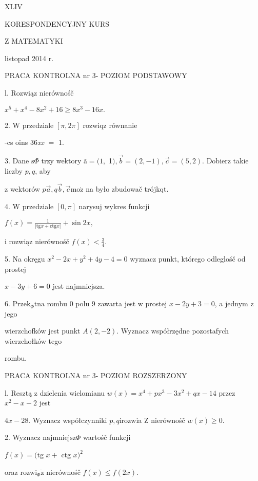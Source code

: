 \documentclass[a4paper,12pt]{article}
\begin{document}
XLIV

KORESPONDENCYJNY KURS

Z MATEMATYKI

listopad 2014 r.

PRACA KONTROLNA nr 3- POZIOM PODSTAWOWY

l. Rozwiąz nierównośč

$x^{5}+x^{4}-8x^{2}+16\geq 8x^{3}-16x.$

2. $\mathrm{W}$ przedziale $[\pi,2\pi]$ rozwiqz równanie

-cs  oins 36{\it xx} $=$ 1.

3. Dane $\mathrm{s}\Phi$ trzy wektory ã$= (1,$ 1$), \vec{b}= (2,-1), \vec{c}= (5,2)$. Dobierz takie liczby $p, q$, aby

$\mathrm{z}$ wektorów $p\vec{a}, q\vec{b}, \vec{c}\mathrm{m}\mathrm{o}\dot{\mathrm{z}}$ na było zbudowač trójkqt.

4. $\mathrm{W}$ przedziale $[0,\pi]$ narysuj wykres funkcji

$f(x)=\displaystyle \frac{1}{|\mathrm{t}\mathrm{g}x+\mathrm{c}\mathrm{t}\mathrm{g}x|}+\sin 2x,$

$\mathrm{i}$ rozwiąz nierównośč $f(x)<\displaystyle \frac{3}{4}.$

5. Na okręgu $x^{2}-2x+y^{2}+4y-4 = 0$ wyznacz punkt, którego odleglośč od prostej

$x-3y+6=0$ jest najmniejsza.

6. $\mathrm{P}\mathrm{r}\mathrm{z}\mathrm{e}\mathrm{k}_{\Phi}\mathrm{t}\mathrm{n}\mathrm{a}$ rombu $0$ polu 9 zawarta jest $\mathrm{w}$ prostej $x-2y+3 = 0$, a jednym $\mathrm{z}$ jego

wierzchofków jest punkt $A(2,-2)$. Wyznacz współrzędne pozostafych wierzchołków tego

rombu.




PRACA KONTROLNA nr 3- POZIOM ROZSZERZONY

l. Resztą $\mathrm{z}$ dzielenia wielomianu $w(x) =x^{4}+px^{3}-3x^{2}+qx-14$ przez $x^{2}-x-2$ jest

$4x-28$. Wyznacz współczynniki $p, q\mathrm{i}$rozwia $\dot{\mathrm{Z}}$ nierównośč $w(x)\geq 0.$

2. Wyznacz $\mathrm{n}\mathrm{a}\mathrm{j}\mathrm{m}\mathrm{n}\mathrm{i}\mathrm{e}\mathrm{j}\mathrm{s}\mathrm{z}\Phi$ wartośč funkcji

$f(x)=($tg $x+$ ctg $x)^{2}$

oraz $\mathrm{r}\mathrm{o}\mathrm{z}\mathrm{w}\mathrm{i}_{\Phi}\dot{\mathrm{z}}$ nierównośč $f(x)\leq f(2x).$
\end{document}
